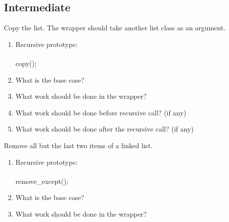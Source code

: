 \documentclass[../../main.tex]{subfiles}
\begin{document}
\pagebreak

\subsection{Intermediate}
\begin{steps}
   \item Copy the list. The wrapper should take another list class as an argument.
      \begin{enumerate}[label=\Alph*.]
         \item Recursive prototype:\\
            \vspace{.5cm}\\
            \underline{\hspace{4cm}}copy(\underline{\hspace{4cm}});
         \item What is the base case?\\
            \vspace{.5cm}
         \item What work should be done in the wrapper?\\
            \vspace{.5cm}
         \item What work should be done before recursive call? (if any)\\
            \vspace{.5cm}
         \item What work should be done after the recursive call? (if any)\\
            \vspace{.5cm}
      \end{enumerate}
   \item Remove all but the last two items of a linked list.
      \begin{enumerate}[label=\Alph*.]
         \item Recursive prototype:\\
            \vspace{.5cm}\\
            \underline{\hspace{4cm}}remove_except(\underline{\hspace{4cm}});
         \item What is the base case?\\
            \vspace{.5cm}
         \item What work should be done in the wrapper?\\

\end{enumerate}
\end{steps}
\end{document}
